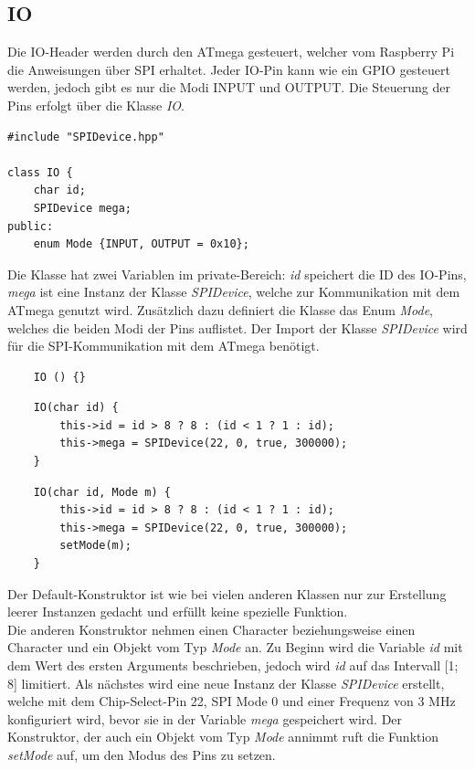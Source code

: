 \documentclass[12pt]{article}
\begin{document}
\subsection{IO}
Die IO-Header werden durch den ATmega gesteuert, welcher vom Raspberry Pi die Anweisungen über SPI erhaltet. Jeder IO-Pin kann wie ein GPIO gesteuert werden, jedoch gibt es nur die Modi INPUT und OUTPUT. Die Steuerung der Pins erfolgt über die Klasse \textit{IO}.
\begin{verbatim}
#include "SPIDevice.hpp"

class IO {
    char id;
    SPIDevice mega;
public:
    enum Mode {INPUT, OUTPUT = 0x10};
\end{verbatim}
\vspace{-2mm}
Die Klasse hat zwei Variablen im private-Bereich: \textit{id} speichert die ID des IO-Pins, \textit{mega} ist eine Instanz der Klasse \textit{SPIDevice}, welche zur Kommunikation mit dem ATmega genutzt wird. Zusätzlich dazu definiert die Klasse das Enum \textit{Mode}, welches die beiden Modi der Pins auflistet. Der Import der Klasse \textit{SPIDevice} wird für die SPI-Kommunikation mit dem ATmega benötigt.\\
\begin{verbatim}
    IO () {}
\end{verbatim}
\begin{verbatim}
    IO(char id) {
        this->id = id > 8 ? 8 : (id < 1 ? 1 : id);
        this->mega = SPIDevice(22, 0, true, 300000);
    }
\end{verbatim}
\begin{verbatim}
    IO(char id, Mode m) {
        this->id = id > 8 ? 8 : (id < 1 ? 1 : id);
        this->mega = SPIDevice(22, 0, true, 300000);
        setMode(m);
    }
\end{verbatim}
\vspace{-2mm}
Der Default-Konstruktor ist wie bei vielen anderen Klassen nur zur Erstellung leerer Instanzen gedacht und erfüllt keine spezielle Funktion. \\Die anderen Konstruktor nehmen einen Character beziehungsweise einen Character und ein Objekt vom Typ \textit{Mode} an. Zu Beginn wird die Variable \textit{id} mit dem Wert des ersten Arguments beschrieben, jedoch wird \textit{id }auf das Intervall [1; 8] limitiert. Als nächstes wird eine neue Instanz der Klasse \textit{SPIDevice} erstellt, welche mit dem Chip-Select-Pin 22, SPI Mode 0 und einer Frequenz von 3 MHz konfiguriert wird, bevor sie in der Variable \textit{mega} gespeichert wird. Der Konstruktor, der auch ein Objekt vom Typ \textit{Mode} annimmt ruft die Funktion \textit{setMode} auf, um den Modus des Pins zu setzen.\\
\end{document}
